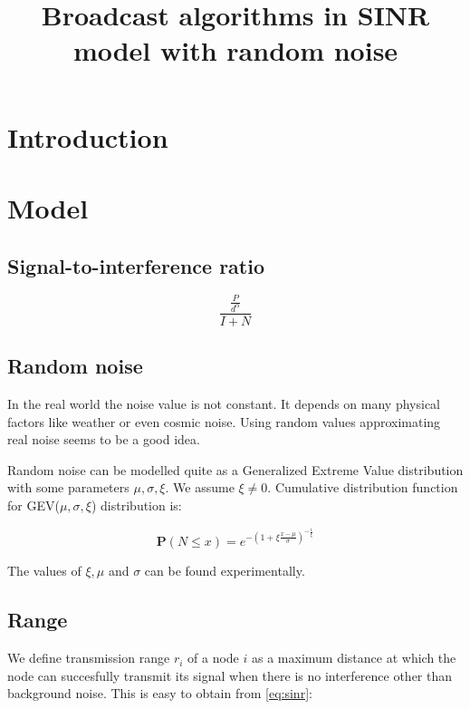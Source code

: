 \documentclass[a4paper,draft,12pt]{report}
\title{Broadcast algorithms in SINR model with random noise}
\begin{document}
\maketitle

\chapter{Introduction}

\chapter{Model}

\section{Signal-to-interference ratio}

\begin{equation}
\label{eq:sinr}
\frac{\frac{P}{d^\alpha}}{I + N}
\end{equation}

\section{Random noise}

In the real world the noise value is not constant. It depends on many physical factors like weather or even cosmic noise. Using random values approximating real noise seems to be a good idea.

Random noise can be modelled quite as a Generalized Extreme Value  \cite{gev} distribution with some parameters $\mu, \sigma, \xi$. We assume $\xi \neq 0$. Cumulative distribution function for GEV($\mu, \sigma, \xi$) distribution is:

\begin{equation}
\label{eq:gev_cdf}
\textbf{P}(N \leq x) = e^{-(1 + \xi \frac{x - \mu}{\sigma}) ^ {-\frac{1}{\xi}}}
\end{equation}

The values of $\xi, \mu$ and $\sigma$ can be found experimentally.

\section{Range}

We define transmission range $r_i$ of a node $i$ as a maximum distance at which the node can succesfully transmit its signal when there is no interference other than background noise. This is easy to obtain from \eqref{eq:sinr}:
\end{document}
